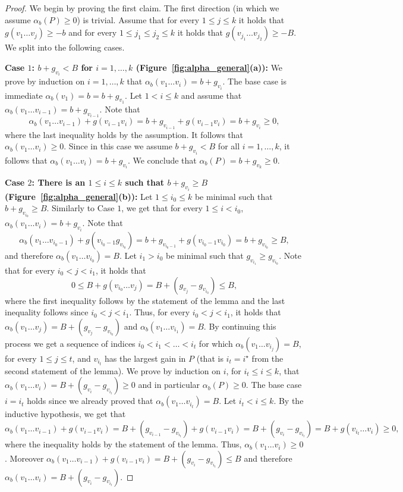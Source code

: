 \documentclass[11pt]{article}
\begin{document}
\begin{proof}
    We begin by proving the first claim. The first direction (in which we assume $\alpha_b(P)\ge 0$) is trivial. Assume that for every $1\le j \le k$ it holds that $g(v_1\ldots v_{j})\ge -b$ and for every $1\le j_1 \le j_2 \le k$ it holds that $g(v_{j_1}\ldots v_{j_2})\ge -B$. We split into the following cases.

    \textbf{Case $1$: $b + g_{v_i}< B$ for $i=1,\ldots ,k$ (Figure~\ref{fig:alpha_general}(a)):}
    We prove by induction on $i=1,\ldots, k $ that $\alpha_b(v_1\ldots v_i) = b + g_{v_i}$. The base case is immediate $\alpha_b(v_1) = b = b+ g_{v_1}$. Let $1 < i \le k$ and assume that $\alpha_b(v_1\ldots v_{i-1}) = b + g_{v_{i-1}}$. Note that
    $$\alpha_b(v_1\ldots v_{i-1})  + g(v_{i-1} v_i) = b+ g_{v_{i-1}} + g(v_{i-1} v_i) = b + g_{v_i} \ge 0,$$
    where the last inequality holds by the assumption. It follows that $\alpha_b(v_1\ldots v_i)\ge 0$. Since in this case we assume $b+g_{v_i} < B$ for all $i=1,\ldots,k$, it follows that $\alpha_b(v_1\ldots v_{i}) = b + g_{v_{i}}$. We conclude that $\alpha_b(P) = b + g_{v_k} \ge 0$.  

    \textbf{Case $2$: There is an $1\le i \le k$ such that $b + g_{v_i} \ge B$ (Figure~\ref{fig:alpha_general}(b)):} 
    Let $1 \le i_0 \le k$ be minimal such that $b+ g_{v_{i_0}} \ge B$. Similarly to Case $1$, we get that for every $1\le i < i_0$,
    $\alpha_b(v_1 \ldots v_i) = b + g_{v_i}$. Note that 
    $$\alpha_b(v_1 \ldots v_{i_0 - 1}) + g(v_{i_0-1} g_{v_{i_0}})
    = b+ g_{v_{i_0-1}} + g(v_{i_0-1} v_{i_0}) 
    = b+ g_{v_{i_0}} \ge B, 
    $$
    and therefore $\alpha_b(v_1 \ldots v_{i_0}) = B$. Let $i_1 > i_0$ be minimal such that $g_{v_{i_1}} \ge g_{v_{i_0}}$.
    Note that for every $i_0< j < i_1$, it holds that 
    \[
    0 \le  B + g(v_{i_0}\ldots v_j) = B + (g_{v_j} - g_{v_{i_0}}) \le B,
    \]
    where the first inequality follows by the statement of the lemma and the last inequality follows since $i_0 < j  < i_1$.    
    Thus, for every $i_0< j < i_1$, it holds that $\alpha_b(v_1\ldots v_j) = B + ( g_{v_j} - g_{v_{i_0}}) $ and $\alpha_b(v_1\ldots v_{i_1}) = B$. By continuing this process we  get a sequence of indices $i_0<i_1< \ldots <i_t$ for which $\alpha_b(v_1 \ldots v_{i_j}) = B$, for every $1\le j \le t$, and $v_{i_{t}}$ has the largest gain in $P$ (that is $i_t=i^\star$ from the second statement of the lemma). We prove by induction on $i$, for $i_t \le i \le k$, that $\alpha_b(v_1 \ldots v_i) = B +   ( g_{v_i} - g_{v_{i_t}}) \ge 0$ and in particular $\alpha_b(P) \ge 0$. The base case $i = i_t$ holds since we already proved that $\alpha_b(v_1\ldots v_{i_t})=B$. Let $i_t < i \le k$. By the inductive hypothesis, we get that
    \[
    \alpha_b(v_1 \ldots v_{i-1}) + g(v_{i-1} v_i) = B + ( g_{v_{i-1}}-g_{v_{i_t}}) + g(v_{i-1} v_i) = B + ( g_{v_i} - g_{v_{i_t}} ) = B + g(v_{i_t} \ldots v_i) \ge 0, 
    \]
    where the inequality holds by the statement of the lemma. Thus, $\alpha_b(v_1 \ldots v_{i}) \ge 0$. Moreover 
    $\alpha_b(v_1 \ldots v_{i-1}) + g(v_{i-1} v_i) = B + ( g_{v_i} - g_{v_{i_t}} ) \le B$ and therefore 
    $\alpha_b(v_1 \ldots v_{i}) = B + (g_{v_i} - g_{v_{i_t}})$.
    

\end{proof}
\end{document}
